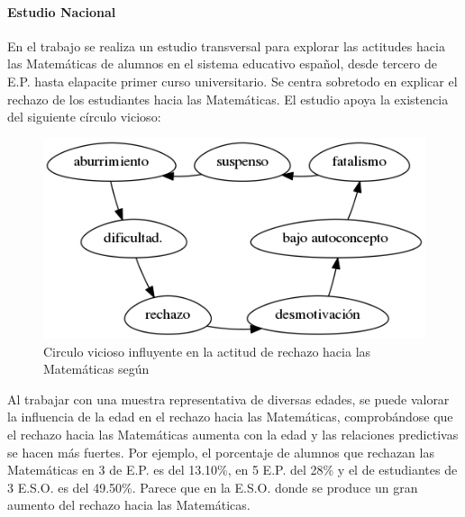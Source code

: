 \paragraph{Estudio Nacional}

En el trabajo \cite{ActitudesHaciaMates} se realiza un estudio transversal para explorar las actitudes hacia las Matemáticas de alumnos en el sistema educativo español, desde tercero de E.P. hasta elapacite primer curso universitario. 
%
Se centra sobretodo en explicar el rechazo de los estudiantes hacia las Matemáticas.
%
El estudio apoya la existencia del siguiente círculo vicioso: 



\begin{figure}[hbt]
\centering
\includegraphics[scale=0.57]{img/circuloVicioso.png}
\caption{Circulo vicioso influyente en la actitud de rechazo hacia las Matemáticas según \citep{ActitudesHaciaMates}}
\label{fig::circuloVicioso}
\end{figure}
\FloatBarrier




Al trabajar con una muestra representativa de diversas edades, se puede valorar la influencia de la edad en el rechazo hacia las Matemáticas, comprobándose que el rechazo hacia las Matemáticas aumenta con la edad y las relaciones predictivas se hacen más fuertes.
%
Por ejemplo, el porcentaje de alumnos que rechazan las Matemáticas en 3 de E.P. es del 13.10\%, en 5 E.P. del 28\%  y el de estudiantes de 3 E.S.O. es del 49.50\%.
%
Parece que en la E.S.O. donde se produce un gran aumento del rechazo hacia las Matemáticas.


